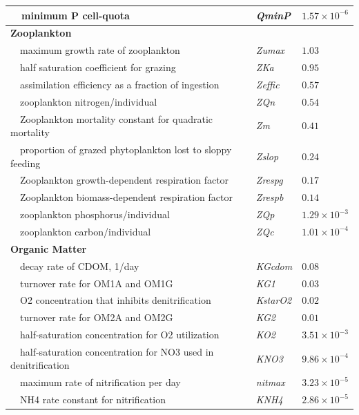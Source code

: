 \documentclass[letterpaper,12pt,oneside]{article}\usepackage[]{graphicx}\usepackage[]{color}
\begin{document}
\begin{table}[!tbp]
{\begin{center}
\begin{tabular}{lll}
~~minimum P cell-quota&\textit{QminP}&$1.57\times 10^{-6}$\tabularnewline
\hline
{\bfseries Zooplankton}&&\tabularnewline
~~maximum growth rate of zooplankton&\textit{Zumax}&$1.03$\tabularnewline
~~half saturation coefficient for grazing&\textit{ZKa}&$0.95$\tabularnewline
~~assimilation efficiency as a fraction of ingestion&\textit{Zeffic}&$0.57$\tabularnewline
~~zooplankton nitrogen/individual&\textit{ZQn}&$0.54$\tabularnewline
~~Zooplankton mortality constant for quadratic mortality&\textit{Zm}&$0.41$\tabularnewline
~~proportion of grazed phytoplankton lost to sloppy feeding&\textit{Zslop}&$0.24$\tabularnewline
~~Zooplankton growth-dependent respiration factor&\textit{Zrespg}&$0.17$\tabularnewline
~~Zooplankton biomass-dependent respiration factor&\textit{Zrespb}&$0.14$\tabularnewline
~~zooplankton phosphorus/individual&\textit{ZQp}&$1.29\times 10^{-3}$\tabularnewline
~~zooplankton carbon/individual&\textit{ZQc}&$1.01\times 10^{-4}$\tabularnewline
\hline
{\bfseries Organic Matter}&&\tabularnewline
~~decay rate of CDOM, 1/day&\textit{KGcdom}&$0.08$\tabularnewline
~~turnover rate for OM1A and OM1G&\textit{KG1}&$0.03$\tabularnewline
~~O2 concentration that inhibits denitrification&\textit{KstarO2}&$0.02$\tabularnewline
~~turnover rate for OM2A and OM2G&\textit{KG2}&$0.01$\tabularnewline
~~half-saturation concentration for O2 utilization&\textit{KO2}&$3.51\times 10^{-3}$\tabularnewline
~~half-saturation concentration for NO3 used in denitrification&\textit{KNO3}&$9.86\times 10^{-4}$\tabularnewline
~~maximum rate of nitrification per day&\textit{nitmax}&$3.23\times 10^{-5}$\tabularnewline
~~NH4 rate constant for nitrification&\textit{KNH4}&$2.86\times 10^{-5}$\tabularnewline
\hline
\end{tabular}\end{center}}

\end{table}
\end{document}
